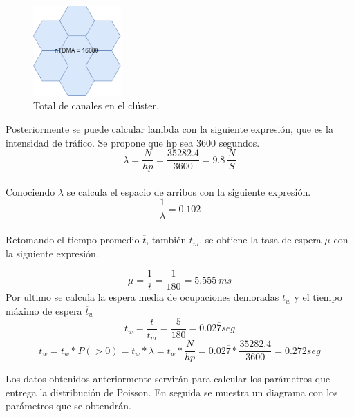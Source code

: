 \documentclass[11pt,letterpaper]{article}
\begin{document}
\begin{figure}[ht]
    \centering
    \includegraphics[width=0.3\textwidth]{imagenes/cluster.png}
    \caption{Total de canales en el clúster.}
\end{figure}

Posteriormente se puede calcular lambda con la siguiente expresión, que es la 
intensidad de tráfico. Se propone que hp sea 3600 segundos.
\begin{equation}
    \lambda=\frac{N}{hp}=\frac{35282.4}{3600}=9.8 \ \frac{N}{S}
\end{equation}
\\
Conociendo $\lambda$ se calcula el espacio de arribos con la siguiente expresión.
\begin{equation}
    \frac{1}{\lambda}=0.102
\end{equation}
\\
Retomando el tiempo promedio $\overline{t}$, también $t_m$, se obtiene la tasa de espera $\mu$ 
con la siguiente expresión. 

\begin{equation}
    \mu=\frac{1}{\overline{t}}=\frac{1}{180}=5.55\overline{5} \ ms
\end{equation}
Por ultimo se calcula la espera media de ocupaciones demoradas $t_w$ y el tiempo máximo 
de espera $\overline{t}_w$
\begin{equation}
    t_w=\frac{t}{t_m}=\frac{5}{180}=0.02\overline{7} seg
\end{equation}
\begin{equation}
    \overline{t}_w=t_w*P(>0)=t_w*\lambda=t_w*\frac{N}{hp}=0.02\overline{7}*\frac{35282.4}{3600}=0.272seg
\end{equation}


\newpage
Los datos obtenidos anteriormente servirán para calcular los parámetros que entrega 
la distribución de Poisson. En seguida se muestra un diagrama con los parámetros que se 
obtendrán.
\end{document}

